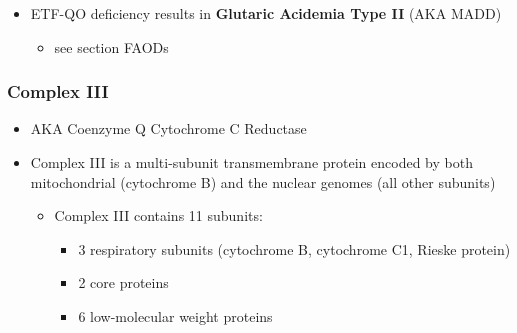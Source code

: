 \documentclass{scrartcl}
\begin{document}
{\small{}}

\begin{itemize}
\item ETF-QO deficiency results in \textbf{Glutaric Acidemia Type II} (AKA MADD)
\begin{itemize}
\item see section FAODs
\end{itemize}
\end{itemize}
\subsubsection{Complex III}
\label{sec:org36b85ea}
\begin{itemize}
\item AKA Coenzyme Q Cytochrome C Reductase
\item Complex III is a multi-subunit transmembrane protein encoded by both
mitochondrial (cytochrome B) and the nuclear genomes (all other
subunits)

\begin{itemize}
\item Complex III contains 11 subunits:
\begin{itemize}
\item 3 respiratory subunits (cytochrome B, cytochrome C1, Rieske protein)
\item 2 core proteins
\item 6 low-molecular weight proteins
\end{itemize}
\end{itemize}

{\small{}}
\end{itemize}
\end{document}
